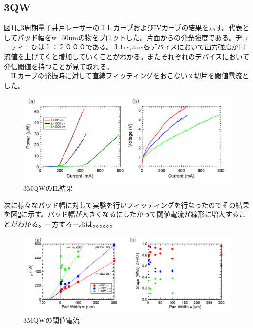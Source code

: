 \subsection{3QW}%
図\ref{fig_3_1_3QW_broacdcontact_IL}に3周期量子井戸レーザーのＩＬカーブおよびIVカーブの結果を示す。代表としてパッド幅をw=50umの物をプロットした。片面からの発光強度である。ヂューティーひは１：２０００である。１1us,2ms各デバイスにおいて出力強度が電流値を上げてくと増加していくことがわかる。またそれぞれのデバイスにおいて発信閾値を持つことが見て取れる。
\\　ILカーブの発振時に対して直線フィッティングをおこないｘ切片を閾値電流とした。
\begin{figure}[h]
	\centering
	\includegraphics[width=12cm]{figure/fig_3_1_3QW_broadcontact_IL.png}
		\caption{3MQWのIL結果}
		\label{fig_3_1_3QW_broacdcontact_IL}
\end{figure}
次に様々なパッド幅に対して実験を行いフィッティングを行なったのでその結果を図\ref{fig_3_1_3QW_broadcontact_Ith}に示す。パッド幅が大きくなるにしたがって閾値電流が線形に増大することがわかる。一方すろーぷは。。。。。。
\begin{figure}[h]
	\centering
	\includegraphics[width=15cm]{figure/fig_3_1_3QW_broadcontact_Ith.png}
		\caption{3MQWの閾値電流}
		\label{fig_3_1_3QW_broadcontact_Ith}
\end{figure}

